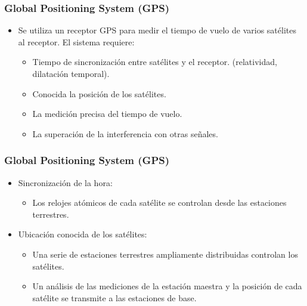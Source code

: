 \documentclass{beamer}
\begin{document}
\begin{frame}
\frametitle{Global Positioning System (GPS)}
\begin{itemize}
\item Se utiliza un receptor GPS para medir el tiempo de vuelo de varios satélites al receptor. El sistema requiere:
\begin{itemize}
\item Tiempo de sincronización entre satélites y el receptor. (relatividad, dilatación temporal).
\item Conocida la posición de los satélites.
\item La medición precisa del tiempo de vuelo.
\item La superación de la interferencia con otras señales.
\end{itemize}
\end{itemize}
\end{frame}

\begin{frame}
\frametitle{Global Positioning System (GPS)}
\begin{itemize}
\item Sincronización de la hora:
\begin{itemize}
\item Los relojes atómicos de cada satélite se controlan desde las estaciones terrestres.
\end{itemize}
\item Ubicación conocida de los satélites:
\begin{itemize}
\item Una serie de estaciones terrestres ampliamente distribuidas controlan los satélites.
\item Un análisis de las mediciones de la estación maestra y la posición de cada satélite se transmite a las estaciones de base. 
\end{itemize}
\end{itemize}
\end{frame}
\end{document}
